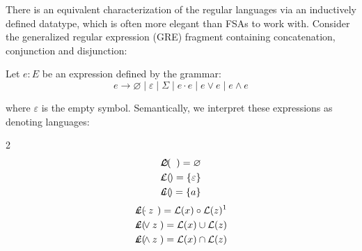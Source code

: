 \documentclass[sigplan,acmsmall,nonacm,screen]{acmart}\settopmatter{printfolios=false,printccs=false,printacmref=false}
\begin{document}
There is an equivalent characterization of the regular languages via an inductively defined datatype, which is often more elegant than FSAs to work with. Consider the generalized regular expression (GRE) fragment containing concatenation, conjunction and disjunction:

\begin{definition}\label{thm:gre_def}
  Let \( e: E \) be an expression defined by the grammar:
  \[
    e \rightarrow \varnothing \mid \varepsilon \mid \Sigma \mid e \cdot e \mid e \lor e \mid e \land e
  \]

where $\varepsilon$ is the empty symbol. Semantically, we interpret these expressions as denoting languages:\vspace{-0.8cm}

  \setlength{\columnseprule}{0pt}
  \setlength{\columnsep}{-3cm}
  \begin{multicols}{2}
    \begin{eqnarray*}
      \mathcal{L}(&\hspace{-0.35cm} \varnothing \hspace{-0.35cm}&) = \varnothing \\
      \mathcal{L}(&\hspace{-0.35cm} \varepsilon \hspace{-0.35cm}&) = \{\varepsilon\} \\
      \mathcal{L}(&\hspace{-0.35cm} a           \hspace{-0.35cm}&) = \{a\}
    \end{eqnarray*} \break\vspace{-0.45cm}
    \begin{eqnarray*}
      \mathcal{L}(&\hspace{-0.35cm} x\cdot z \hspace{-0.35cm}&) = \mathcal{L}(x) \circ \mathcal{L}(z)\text{\footnotemark}\\
      \mathcal{L}(&\hspace{-0.35cm} x\vee  z \hspace{-0.35cm}&) = \mathcal{L}(x) \cup  \mathcal{L}(z)\\
      \mathcal{L}(&\hspace{-0.35cm} x\land z \hspace{-0.35cm}&) = \mathcal{L}(x) \cap  \mathcal{L}(z)
    \end{eqnarray*}
  \end{multicols}
\end{definition}\vspace{-0.2cm}
\end{document}
